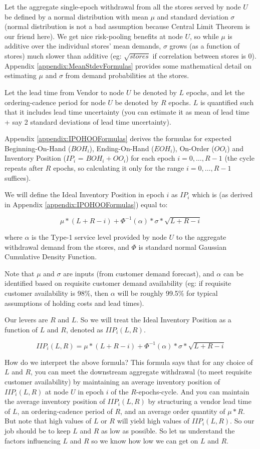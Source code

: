 \documentclass[11pt]{amsart}
\begin{document}
Let the aggregate single-epoch withdrawal from all the stores served by node $U$ be defined by a normal distribution with mean $\mu$ and standard deviation $\sigma$ (normal distribution is not a bad assumption because Central Limit Theorem is our friend here). We get nice risk-pooling benefits at node $U$, so while $\mu$ is additive over the individual stores' mean demands, $\sigma$ grows (as a function of stores) much slower than additive (eg: $\sqrt{stores}$ if correlation between stores is 0). Appendix \ref{appendix:MeanStdevFormulas} provides some mathematical detail on estimating $\mu$ and $\sigma$ from demand probabilities at the stores.
 
Let the lead time from Vendor to node $U$ be denoted by $L$ epochs, and let the ordering-cadence period for node $U$ be denoted by $R$ epochs. $L$ is quantified such that it includes lead time uncertainty (you can estimate it as mean of lead time + say 2 standard deviations of lead time uncertainty).
 
Appendix \ref{appendix:IPOHOOFormulas} derives the formulas for expected Beginning-On-Hand ($BOH_i$), Ending-On-Hand ($EOH_i$), On-Order ($OO_i$) and Inventory Position ($IP_i$ = $BOH_i + OO_i$) for each epoch $i = 0, \ldots, R - 1$ (the cycle repeats after $R$ epochs, so calculating it only for the range $i = 0, \ldots, R - 1$ suffices).

We will define the Ideal Inventory Position in epoch $i$ as $IP_i$ which is (as derived in Appendix \ref{appendix:IPOHOOFormulas}) equal to:
 
$$\mu * (L + R - i) + \Phi^{-1}(\alpha) * \sigma * \sqrt{L+R-i}$$

where $\alpha$ is the Type-1 service level provided by node $U$ to the aggregate withdrawal demand from the stores, and $\Phi$ is standard normal Gaussian Cumulative Density Function.
 
Note that $\mu$ and $\sigma$ are inputs (from customer demand forecast), and $\alpha$ can be identified based on requisite customer demand availability (eg: if requisite customer availability is 98\%, then $\alpha$ will be roughly 99.5\% for typical assumptions of holding costs and lead times). 

Our levers are $R$ and $L$. So we will treat the Ideal Inventory Position as a function of $L$ and $R$, denoted as $IIP_i(L, R)$.

$$IIP_i(L, R) = \mu * (L + R - i) + \Phi^{-1}(\alpha) * \sigma * \sqrt{L+R-i}$$

How do we interpret the above formula? This formula says that for any choice of $L$ and $R$, you can meet the downstream aggregate withdrawal (to meet requisite customer availability) by maintaining an average inventory position of $IIP_i(L,R)$ at node $U$ in epoch $i$ of the $R$-epochs-cycle. And you can maintain the average inventory position of $IIP_i(L,R)$ by structuring a vendor lead time of $L$, an ordering-cadence period of $R$, and an average order quantity of $\mu * R$. But note that high values of $L$ or $R$ will yield high values of $IIP_i(L,R)$. So our job should be to keep $L$ and $R$ as low as possible. So let us understand the factors influencing $L$ and $R$ so we know how low we can get on $L$ and $R$.
\end{document}
